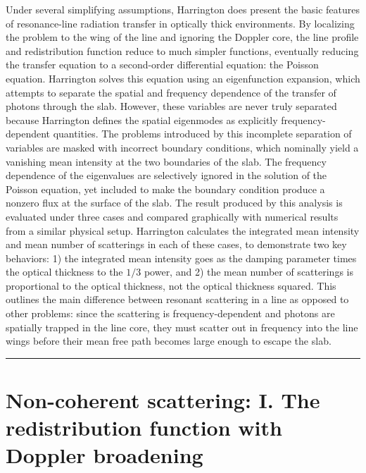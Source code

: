 \documentclass[onecolumn]{aastex63}
\begin{document}
Under several simplifying assumptions, Harrington does present the basic features of resonance-line radiation transfer in optically thick environments. By localizing the problem to the wing of the line and ignoring the Doppler core, the line profile and redistribution function reduce to much simpler functions, eventually reducing the transfer equation to a second-order differential equation: the Poisson equation. Harrington solves this equation using an eigenfunction expansion, which attempts to separate the spatial and frequency dependence of the transfer of photons through the slab. However, these variables are never truly separated because Harrington defines the spatial eigenmodes as explicitly frequency-dependent quantities. The problems introduced by this incomplete separation of variables are masked with incorrect boundary conditions, which nominally yield a vanishing mean intensity at the two boundaries of the slab. The frequency dependence of the eigenvalues are selectively ignored in the solution of the Poisson equation, yet included to make the boundary condition produce a nonzero flux at the surface of the slab. The result produced by this analysis is evaluated under three cases and compared graphically with numerical results from a similar physical setup. Harrington calculates the integrated mean intensity and mean number of scatterings in each of these cases, to demonstrate two key behaviors: 1) the integrated mean intensity goes as the damping parameter times the optical thickness to the $1/3$ power, and 2) the mean number of scatterings is proportional to the optical thickness, not the optical thickness squared. This outlines the main difference between resonant scattering in a line as opposed to other problems: since the scattering is frequency-dependent and photons are spatially trapped in the line core, they must scatter out in frequency into the line wings before their mean free path becomes large enough to escape the slab.



\vspace{1cm}
\hrule
\vspace{1cm}

\section{ Non-coherent scattering: I. The redistribution function with Doppler broadening}
\begin{centering}

\cite{hummer1962}

\end{centering}
\end{document}
